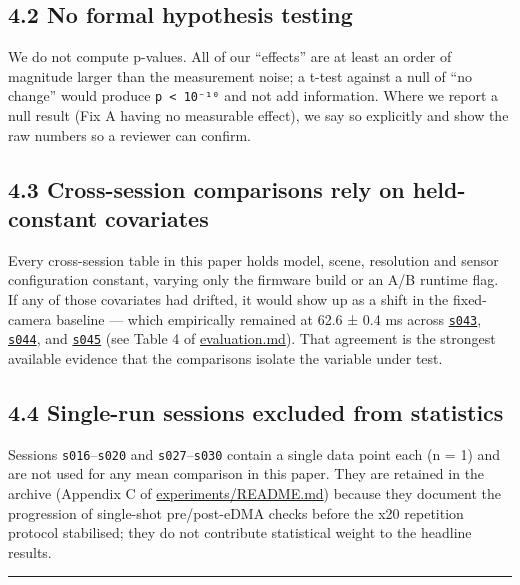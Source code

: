 \subsection{4.2 No formal hypothesis
testing}\label{no-formal-hypothesis-testing}

We do not compute p-values. All of our ``effects'' are at least an order
of magnitude larger than the measurement noise; a t-test against a null
of ``no change'' would produce \texttt{p\ \textless{}\ 10⁻¹⁰} and not
add information. Where we report a null result (Fix A having no
measurable effect), we say so explicitly and show the raw numbers so a
reviewer can confirm.

\subsection{4.3 Cross-session comparisons rely on held-constant
covariates}\label{cross-session-comparisons-rely-on-held-constant-covariates}

Every cross-session table in this paper holds model, scene, resolution
and sensor configuration constant, varying only the firmware build or an
A/B runtime flag. If any of those covariates had drifted, it would show
up as a shift in the fixed-camera baseline --- which empirically
remained at 62.6 ± 0.4 ms across
\href{../experiments/s043_e18_headtail_drain2/}{\texttt{s043}},
\href{../experiments/s044_e18_headtail_drain2/}{\texttt{s044}}, and
\href{../experiments/s045_e18_post_refactor/}{\texttt{s045}} (see Table
4 of \url{evaluation.md}). That agreement is the strongest available
evidence that the comparisons isolate the variable under test.

\subsection{4.4 Single-run sessions excluded from
statistics}\label{single-run-sessions-excluded-from-statistics}

Sessions \texttt{s016}--\texttt{s020} and \texttt{s027}--\texttt{s030}
contain a single data point each (n = 1) and are not used for any mean
comparison in this paper. They are retained in the archive (Appendix C
of \href{../experiments/README.md}{experiments/README.md}) because they
document the progression of single-shot pre/post-eDMA checks before the
x20 repetition protocol stabilised; they do not contribute statistical
weight to the headline results.

\begin{center}\rule{0.5\linewidth}{0.5pt}\end{center}

